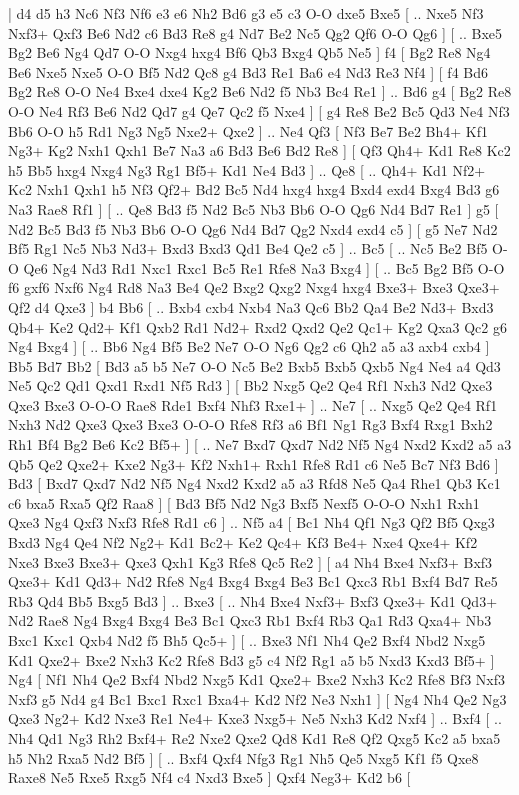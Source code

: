 \makegametitle 
|   d4   d5    h3   Nc6    Nf3   Nf6    e3   e6    Nh2   Bd6    g3   e5    c3   O-O    dxe5   Bxe5 [ .. Nxe5  Nf3 Nxf3+  Qxf3 Be6  Nd2 c6  Bd3 Re8  g4 Nd7  Be2 Nc5  Qg2 Qf6  O-O Qg6   ]  [ .. Bxe5  Bg2 Be6  Ng4 Qd7  O-O Nxg4  hxg4 Bf6  Qb3 Bxg4  Qb5 Ne5   ]  f4 [  Bg2 Re8  Ng4 Be6  Nxe5 Nxe5  O-O Bf5  Nd2 Qc8  g4 Bd3  Re1 Ba6  e4 Nd3  Re3 Nf4   ]  [  f4 Bd6  Bg2 Re8  O-O Ne4  Bxe4 dxe4  Kg2 Be6  Nd2 f5  Nb3 Bc4  Re1   ] .. Bd6    g4 [  Bg2 Re8  O-O Ne4  Rf3 Be6  Nd2 Qd7  g4 Qe7  Qc2 f5  Nxe4   ]  [  g4 Re8  Be2 Bc5  Qd3 Ne4  Nf3 Bb6  O-O h5  Rd1 Ng3  Ng5 Nxe2+  Qxe2   ] .. Ne4    Qf3 [  Nf3 Be7  Be2 Bh4+  Kf1 Ng3+  Kg2 Nxh1  Qxh1 Be7  Na3 a6  Bd3 Be6  Bd2 Re8   ]  [  Qf3 Qh4+  Kd1 Re8  Kc2 h5  Bb5 hxg4  Nxg4 Ng3  Rg1 Bf5+  Kd1 Ne4  Bd3   ] .. Qe8 [ .. Qh4+  Kd1 Nf2+  Kc2 Nxh1  Qxh1 h5  Nf3 Qf2+  Bd2 Bc5  Nd4 hxg4  hxg4 Bxd4  exd4 Bxg4  Bd3 g6  Na3 Rae8  Rf1   ]  [ .. Qe8  Bd3 f5  Nd2 Bc5  Nb3 Bb6  O-O Qg6  Nd4 Bd7  Re1   ]  g5 [  Nd2 Bc5  Bd3 f5  Nb3 Bb6  O-O Qg6  Nd4 Bd7  Qg2 Nxd4  exd4 c5   ]  [  g5 Ne7  Nd2 Bf5  Rg1 Nc5  Nb3 Nd3+  Bxd3 Bxd3  Qd1 Be4  Qe2 c5   ] .. Bc5 [ .. Nc5  Be2 Bf5  O-O Qe6  Ng4 Nd3  Rd1 Nxc1  Rxc1 Bc5  Re1 Rfe8  Na3 Bxg4   ]  [ .. Bc5  Bg2 Bf5  O-O f6  gxf6 Nxf6  Ng4 Rd8  Na3 Be4  Qe2 Bxg2  Qxg2 Nxg4  hxg4 Bxe3+  Bxe3 Qxe3+  Qf2 d4  Qxe3   ]  b4   Bb6 [ .. Bxb4  cxb4 Nxb4  Na3 Qc6  Bb2 Qa4  Be2 Nd3+  Bxd3 Qb4+  Ke2 Qd2+  Kf1 Qxb2  Rd1 Nd2+  Rxd2 Qxd2  Qe2 Qc1+  Kg2 Qxa3  Qc2 g6  Ng4 Bxg4   ]  [ .. Bb6  Ng4 Bf5  Be2 Ne7  O-O Ng6  Qg2 c6  Qh2 a5  a3 axb4  cxb4   ]  Bb5   Bd7    Bb2 [  Bd3 a5  b5 Ne7  O-O Nc5  Be2 Bxb5  Bxb5 Qxb5  Ng4 Ne4  a4 Qd3  Ne5 Qc2  Qd1 Qxd1  Rxd1 Nf5  Rd3   ]  [  Bb2 Nxg5  Qe2 Qe4  Rf1 Nxh3  Nd2 Qxe3  Qxe3 Bxe3  O-O-O Rae8  Rde1 Bxf4  Nhf3 Rxe1+   ] .. Ne7 [ .. Nxg5  Qe2 Qe4  Rf1 Nxh3  Nd2 Qxe3  Qxe3 Bxe3  O-O-O Rfe8  Rf3 a6  Bf1 Ng1  Rg3 Bxf4  Rxg1 Bxh2  Rh1 Bf4  Bg2 Be6  Kc2 Bf5+   ]  [ .. Ne7  Bxd7 Qxd7  Nd2 Nf5  Ng4 Nxd2  Kxd2 a5  a3 Qb5  Qe2 Qxe2+  Kxe2 Ng3+  Kf2 Nxh1+  Rxh1 Rfe8  Rd1 c6  Ne5 Bc7  Nf3 Bd6   ]  Bd3 [  Bxd7 Qxd7  Nd2 Nf5  Ng4 Nxd2  Kxd2 a5  a3 Rfd8  Ne5 Qa4  Rhe1 Qb3  Kc1 c6  bxa5 Rxa5  Qf2 Raa8   ]  [  Bd3 Bf5  Nd2 Ng3  Bxf5 Nexf5  O-O-O Nxh1  Rxh1 Qxe3  Ng4 Qxf3  Nxf3 Rfe8  Rd1 c6   ] .. Nf5    a4 [  Bc1 Nh4  Qf1 Ng3  Qf2 Bf5  Qxg3 Bxd3  Ng4 Qe4  Nf2 Ng2+  Kd1 Bc2+  Ke2 Qc4+  Kf3 Be4+  Nxe4 Qxe4+  Kf2 Nxe3  Bxe3 Bxe3+  Qxe3 Qxh1  Kg3 Rfe8  Qc5 Re2   ]  [  a4 Nh4  Bxe4 Nxf3+  Bxf3 Qxe3+  Kd1 Qd3+  Nd2 Rfe8  Ng4 Bxg4  Bxg4 Be3  Bc1 Qxc3  Rb1 Bxf4  Bd7 Re5  Rb3 Qd4  Bb5 Bxg5  Bd3   ] .. Bxe3 [ .. Nh4  Bxe4 Nxf3+  Bxf3 Qxe3+  Kd1 Qd3+  Nd2 Rae8  Ng4 Bxg4  Bxg4 Be3  Bc1 Qxc3  Rb1 Bxf4  Rb3 Qa1  Rd3 Qxa4+  Nb3 Bxc1  Kxc1 Qxb4  Nd2 f5  Bh5 Qc5+   ]  [ .. Bxe3  Nf1 Nh4  Qe2 Bxf4  Nbd2 Nxg5  Kd1 Qxe2+  Bxe2 Nxh3  Kc2 Rfe8  Bd3 g5  c4 Nf2  Rg1 a5  b5 Nxd3  Kxd3 Bf5+   ]  Ng4 [  Nf1 Nh4  Qe2 Bxf4  Nbd2 Nxg5  Kd1 Qxe2+  Bxe2 Nxh3  Kc2 Rfe8  Bf3 Nxf3  Nxf3 g5  Nd4 g4  Bc1 Bxc1  Rxc1 Bxa4+  Kd2 Nf2  Ne3 Nxh1   ]  [  Ng4 Nh4  Qe2 Ng3  Qxe3 Ng2+  Kd2 Nxe3  Re1 Ne4+  Kxe3 Nxg5+  Ne5 Nxh3  Kd2 Nxf4   ] .. Bxf4 [ .. Nh4  Qd1 Ng3  Rh2 Bxf4+  Re2 Nxe2  Qxe2 Qd8  Kd1 Re8  Qf2 Qxg5  Kc2 a5  bxa5 h5  Nh2 Rxa5  Nd2 Bf5   ]  [ .. Bxf4  Qxf4 Nfg3  Rg1 Nh5  Qe5 Nxg5  Kf1 f5  Qxe8 Raxe8  Ne5 Rxe5  Rxg5 Nf4  c4 Nxd3  Bxe5   ]  Qxf4   Neg3+    Kd2   b6 [ 